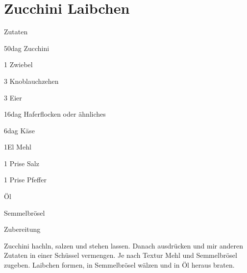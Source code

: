 \chapter*{Zucchini Laibchen}
\begin{multicols}{2}
 {\Large Zutaten}
 \begin{Zutaten}
		\item 50dag Zucchini
		\item 1 Zwiebel
		\item 3 Knoblauchzehen
		\item 3 Eier
		\item 16dag Haferflocken oder ähnliches
		\item 6dag Käse
		\item 1El Mehl
		\item 1 Prise Salz
		\item 1 Prise Pfeffer
		\item Öl
		\item Semmelbrösel
		
\end{Zutaten}
	
\columnbreak
{}
\end{multicols}

{\Large Zubereitung} \newline
\begin{addmargin}[1cm]{0cm}
	Zucchini hachln, salzen und stehen lassen.\newline
	Danach ausdrücken und mir anderen Zutaten in einer Schüssel vermengen.\newline
	Je nach Textur Mehl und Semmelbrösel zugeben.\newline
	Laibchen formen, in Semmelbrösel wälzen und in Öl heraus braten.
	
	
\end{addmargin}
